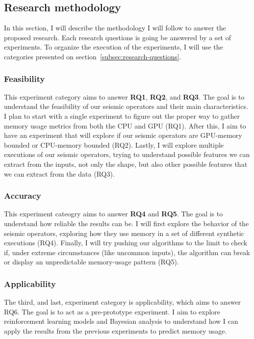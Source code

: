 \subsection{Research methodology}
\label{subsec:research-methodology}

In this section, I will describe the methodology I will follow to answer the proposed research.
Each research questions is going be answered by a set of experiments.
To organize the execution of the experiments, I will use the categories presented on section~\ref{subsec:research-questions}.

\subsubsection{Feasibility}

This experiment category aims to answer \textbf{RQ1}, \textbf{RQ2}, and \textbf{RQ3}.
The goal is to understand the feasibility of our seismic operators and their main characteristics.
I plan to start with a single experiment to figure out the proper way to gather memory usage metrics from both the CPU and GPU (RQ1).
After this, I aim to have an experiment that will explore if our seismic operators are GPU-memory bounded or CPU-memory bounded (RQ2).
Lastly, I will explore multiple executions of our seismic operators, trying to understand possible features we can extract from the inputs, not only the shape, but also other possible features that we can extract from the data (RQ3).

\subsubsection{Accuracy}

This experiment cateogry aims to answer \textbf{RQ4} and \textbf{RQ5}.
The goal is to understand how reliable the results can be.
I will first explore the behavior of the seismic operators, exploring how they use memory in a set of different synthetic executions (RQ4).
Finally, I will try pushing our algorithms to the limit to check if, under extreme circumstances (like uncommon inputs), the algorithm can break or display an unpredictable memory-usage pattern (RQ5).

\subsubsection{Applicability}

The third, and last, experiment category is applicability, which aims to answer RQ6.
The goal is to act as a pre-prototype experiment.
I aim to explore reinforcement learning models and Bayesian analysis to understand how I can apply the results from the previous experiments to predict memory usage.

